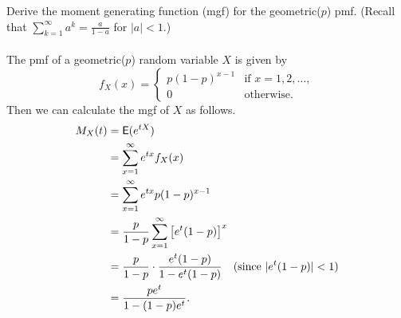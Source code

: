 \documentclass[12pt]{article}
\newcommand{\E}{{\sf E}}
\newenvironment{problem}[2][Problem]{\begin{trivlist}
\item[\hskip \labelsep {\bfseries #1}\hskip \labelsep {\bfseries #2.}]}
{\end{trivlist}}
\begin{document}
\begin{problem}{4}
  Derive the moment generating function (mgf) for the geometric($p$) pmf. 
  (Recall that $\sum_{k=1}^{\infty} a^k = \frac{a}{1 - a}$ 
  for $|a| < 1$.)
  \\\\
  The pmf of a geometric($p$) random variable $X$ is given by
  \[
    f_X (x) =
    \begin{cases}
      p(1-p)^{x-1} & \text{if } x = 1, 2, \ldots, \\
      0 & \text{otherwise}.
    \end{cases}
  \]
  Then we can calculate the mgf of $X$ as follows.
  \[
    \begin{aligned}
      M_X (t) &= \E(e^{tX}) \\
      &= \sum_{x=1}^{\infty} e^{tx} f_X (x) \\
      &= \sum_{x=1}^{\infty} e^{tx} p(1-p)^{x-1} \\
      &= \frac{p}{1-p} \sum_{x=1}^{\infty} \left[e^t (1-p)\right]^x \\
      &= \frac{p}{1-p} \cdot \frac{e^t (1-p)}{1 - e^t (1-p)} \quad
      (\text{since } |e^t (1-p)| < 1) \\
      &= \frac{p e^t}{1 - (1-p)e^t}.
    \end{aligned}
  \]

\end{problem}

\end{document}
